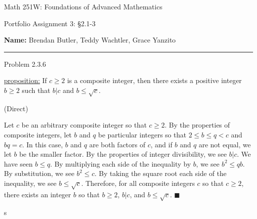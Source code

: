 \documentclass{article}
\theoremstyle{definition}
\begin{document}
	\begin{center}
		\Large{Math 251W: Foundations of Advanced Mathematics}

		\normalsize{Portfolio Assignment 3: \S 2.1-3}

		\vspace{0.2cm}

		\hfill {\bf Name:} Brendan Butler, Teddy Wachtler, Grace Yanzito

		\vspace{0.25cm}
		\hrule
	\end{center}

	\vspace{0.3cm}


	\noindent Problem 2.3.6
	\vspace{0.3cm}

	\underline{proposition:} If $c\ge 2$ is a composite integer, then there exists a positive integer $b\ge 2$ such that $b|c$ and $b\le
	\sqrt{c}$.

	\vspace{0.3cm}
	 (Direct)
	\vspace{0.2cm}

	Let $c$ be an arbitrary composite integer so that $c \geq 2$.
	By the properties of composite integers, let $b$ and $q$ be particular integers so that $2 \leq b \leq q < c$ and $bq = c$.
	In this case, $b$ and $q$ are both factors of $c$, and if $b$ and $q$ are not equal, we let $b$ be the smaller factor.
	By the properties of integer divisibility, we see $b | c$.
	We have seen $b \leq q$.
	By multiplying each side of the inequality by $b$, we see $b^2 \leq qb$.
	By substitution, we see $b^2 \leq c$.
	By taking the square root each side of the inequality, we see $b \leq \sqrt{c}$.
	Therefore, for all composite integers $c$ so that $c \geq 2$, there exists an integer $b$ so that $b \geq 2$, $b | c$, and $b \leq \sqrt{c}$.
	$\blacksquare$

	\vspace{1cm}s

\end{document}
